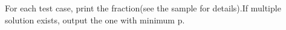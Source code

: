 For each test case, print the fraction(see the sample for details).If multiple solution exists, output the one with minimum p.